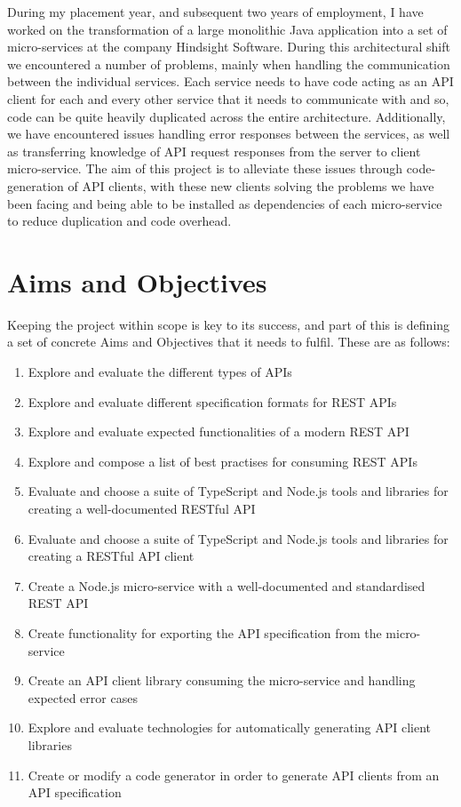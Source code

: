 During my placement year, and subsequent two years of employment, I  have worked on the transformation of a large monolithic Java application into a set of micro-services at the company Hindsight Software. During this architectural shift we encountered a number of problems, mainly when handling the communication between the individual services. Each service needs to have code acting as an API client for each and every other service that it needs to communicate with and so, code can be quite heavily duplicated across the entire architecture. Additionally, we have encountered issues handling error responses between the services, as well as transferring knowledge of API request responses from the server to client micro-service. The aim of this project is to alleviate these issues through code-generation of API clients, with these new clients solving the problems we have been facing and being able to be installed as dependencies of each micro-service to reduce duplication and code overhead.

\section{Aims and Objectives}
Keeping the project within scope is key to its success, and part of this is defining a set of concrete Aims and Objectives that it needs to fulfil. These are as follows:

\begin{enumerate}
   \item Explore and evaluate the different types of APIs
   \item Explore and evaluate different specification formats for REST APIs
   \item Explore and evaluate expected functionalities of a modern REST API
   \item Explore and compose a list of best practises for consuming REST APIs
   \item Evaluate and choose a suite of TypeScript and Node.js tools and libraries for creating a well-documented RESTful API
   \item Evaluate and choose a suite of TypeScript and Node.js tools and libraries for creating a RESTful API client
   \item Create a Node.js micro-service with a well-documented and standardised REST API
   \item Create functionality for exporting the API specification from the micro-service
   \item Create an API client library consuming the micro-service and handling expected error cases
   \item Explore and evaluate technologies for automatically generating API client libraries
   \item Create or modify a code generator in order to generate API clients from an API specification
 \end{enumerate} 
